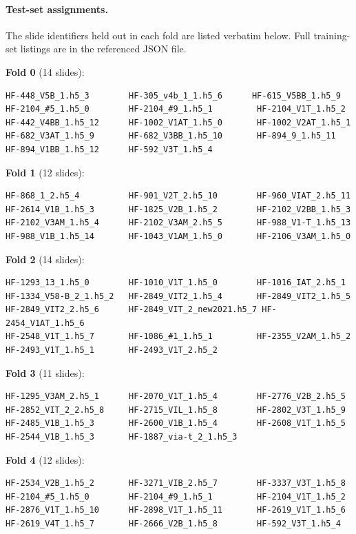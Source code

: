 \paragraph{Test-set assignments.} The slide identifiers held out in each fold are listed verbatim below. Full training-set listings are in the referenced JSON file.

\medskip
\noindent\textbf{Fold 0} (14 slides):
\begin{verbatim}
HF-448_V5B_1.h5_3        HF-305_v4b_1_1.h5_6      HF-615_V5BB_1.h5_9
HF-2104_#5_1.h5_0        HF-2104_#9_1.h5_1         HF-2104_V1T_1.h5_2
HF-442_V4BB_1.h5_12      HF-1002_V1AT_1.h5_0       HF-1002_V2AT_1.h5_1
HF-682_V3AT_1.h5_9       HF-682_V3BB_1.h5_10       HF-894_9_1.h5_11
HF-894_V1BB_1.h5_12      HF-592_V3T_1.h5_4
\end{verbatim}

\medskip
\noindent\textbf{Fold 1} (12 slides):
\begin{verbatim}
HF-868_1_2.h5_4          HF-901_V2T_2.h5_10        HF-960_VIAT_2.h5_11
HF-2614_V1B_1.h5_3       HF-1825_V2B_1.h5_2        HF-2102_V2BB_1.h5_3
HF-2102_V3AM_1.h5_4      HF-2102_V3AM_2.h5_5       HF-988_V1-T_1.h5_13
HF-988_V1B_1.h5_14       HF-1043_V1AM_1.h5_0       HF-2106_V3AM_1.h5_0
\end{verbatim}

\medskip
\noindent\textbf{Fold 2} (14 slides):
\begin{verbatim}
HF-1293_13_1.h5_0        HF-1010_V1T_1.h5_0        HF-1016_IAT_2.h5_1
HF-1334_V58-B_2_1.h5_2   HF-2849_VIT2_1.h5_4       HF-2849_VIT2_1.h5_5
HF-2849_VIT2_2.h5_6      HF-2849_VIT_2_new2021.h5_7 HF-2454_V1AT_1.h5_6
HF-2548_V1T_1.h5_7       HF-1086_#1_1.h5_1         HF-2355_V2AM_1.h5_2
HF-2493_V1T_1.h5_1       HF-2493_V1T_2.h5_2
\end{verbatim}

\medskip
\noindent\textbf{Fold 3} (11 slides):
\begin{verbatim}
HF-1295_V3AM_2.h5_1      HF-2070_V1T_1.h5_4        HF-2776_V2B_2.h5_5
HF-2852_VIT_2_2.h5_8     HF-2715_VIL_1.h5_8        HF-2802_V3T_1.h5_9
HF-2485_V1B_1.h5_3       HF-2600_V1B_1.h5_4        HF-2608_V1T_1.h5_5
HF-2544_V1B_1.h5_3       HF-1887_via-t_2_1.h5_3
\end{verbatim}

\medskip
\noindent\textbf{Fold 4} (12 slides):
\begin{verbatim}
HF-2534_V2B_1.h5_2       HF-3271_VIB_2.h5_7        HF-3337_V3T_1.h5_8
HF-2104_#5_1.h5_0        HF-2104_#9_1.h5_1         HF-2104_V1T_1.h5_2
HF-2876_V1T_1.h5_10      HF-2898_V1T_1.h5_11       HF-2619_V1T_1.h5_6
HF-2619_V4T_1.h5_7       HF-2666_V2B_1.h5_8        HF-592_V3T_1.h5_4
\end{verbatim}
